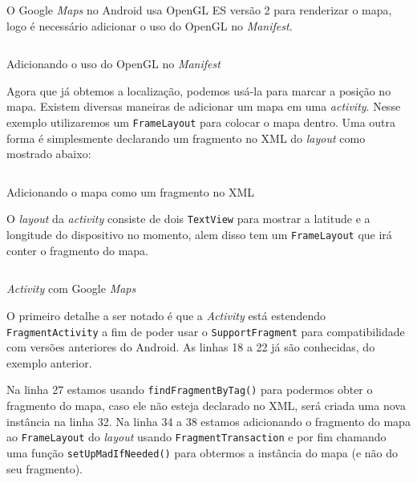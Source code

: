 \documentclass[a4paper,12pt,brazil,oneside]{book}
\begin{document}
		O Google \emph{Maps} no Android usa OpenGL ES versão 2 para renderizar o mapa, logo é necessário adicionar o uso do OpenGL no \emph{Manifest}.

		\begin{listing}[H]
		\inputminted[linenos=true,fontsize=\small,frame=lines, framesep=2mm, tabsize=2,numbersep=5pt]{xml}{src/api/maps/opengl.xml}
		\caption{Adicionando o uso do OpenGL no \emph{Manifest}}
		\label{code:mapfrag}
		\end{listing} 	

		Agora que já obtemos a localização, podemos usá-la para marcar a posição no mapa. Existem diversas maneiras de adicionar um mapa em uma \emph{activity}. Nesse exemplo utilizaremos um \texttt{FrameLayout} para colocar o mapa dentro. Uma outra forma é simplesmente declarando um fragmento no XML do \emph{layout} como mostrado abaixo:

		\begin{listing}[H]
		\inputminted[linenos=true,fontsize=\small,frame=lines, framesep=2mm, tabsize=2,numbersep=5pt]{xml}{src/api/maps/frag.xml}
		\caption{Adicionando o mapa como um fragmento no XML}
		\label{code:mapfrag2}
		\end{listing} 	
		
		O \emph{layout} da \emph{activity} consiste de dois \texttt{TextView} para mostrar a latitude e a longitude do dispositivo no momento, alem disso tem um \texttt{FrameLayout} que irá conter o fragmento do mapa.

		\begin{listing}[H]
		\inputminted[linenos=true,fontsize=\small,frame=lines, framesep=2mm, tabsize=2,numbersep=5pt]{java}{src/api/maps/activity.java}
		\caption{\emph{Activity} com Google \emph{Maps}}
		\label{code:mapactivity}
		\end{listing} 	
		
		O primeiro detalhe a ser notado é que a \emph{Activity} está estendendo \texttt{FragmentActivity} a fim de poder usar o \texttt{SupportFragment} para compatibilidade com versões anteriores do Android. As linhas 18 a 22 já são conhecidas, do exemplo anterior. 

		Na linha 27 estamos usando \texttt{findFragmentByTag()} para podermos obter o fragmento do mapa, caso ele não esteja declarado no XML, será criada uma nova instância na linha 32. Na linha 34 a 38 estamos adicionando o fragmento do mapa ao \texttt{FrameLayout} do \emph{layout} usando \texttt{FragmentTransaction} e por fim chamando uma função \texttt{setUpMadIfNeeded()} para obtermos a instância do mapa (e não do seu fragmento). 
\end{document}
